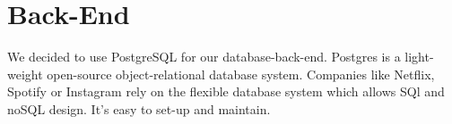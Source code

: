 \section{Back-End}
We decided to use PostgreSQL for our database-back-end. Postgres is a light-weight open-source object-relational database system. 
Companies like Netflix, Spotify or Instagram \parencite{postgresUsers} rely on the flexible database system which allows SQl and noSQL design.
It's easy to set-up and maintain. 


